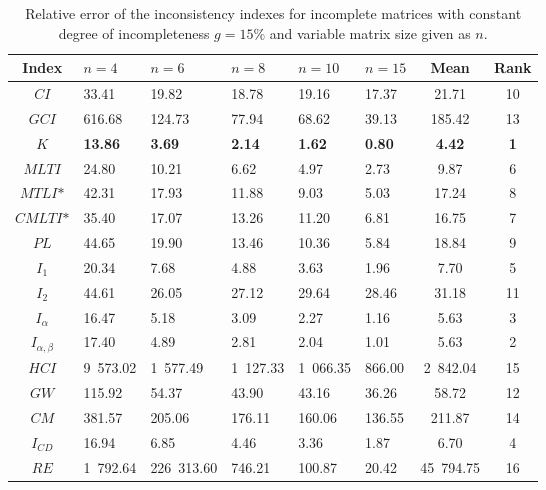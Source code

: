 \begin{table}[ht]
\begin{center}
\caption{Relative error of the inconsistency indexes for incomplete matrices with constant degree of incompleteness $g=15\%$ and variable matrix size given as $n$.}
\label{tab:results1}
\begin{tabular}{|c||l|l|l|l|l||c|c|}
\hline Index & $n = 4$ & $n = 6$ & $n = 8$ & $n = 10$ & $n = 15$ & Mean & Rank \\ \hline \hline
$\textit{CI}$ & 33.41 & 19.82 & 18.78 & 19.16 & 17.37 & 21.71 & 10 \\ \hline
$\textit{GCI}$ & 616.68 & 124.73 & 77.94 & 68.62 & 39.13 & 185.42 & 13 \\ \hline
$\textit{K}$ & \textbf{13.86} & \textbf{3.69} & \textbf{2.14} & \textbf{1.62} & \textbf{0.80} & \textbf{4.42} & \textbf{1} \\ \hline
$\textit{MLTI}$ & 24.80 & 10.21 & 6.62 & 4.97 & 2.73 & 9.87 & 6 \\ \hline
$\textit{MTLI*}$ & 42.31 & 17.93 & 11.88 & 9.03 & 5.03 & 17.24 & 8 \\ \hline
$\textit{CMLTI*}$ & 35.40 & 17.07 & 13.26 & 11.20 & 6.81 & 16.75 & 7 \\ \hline
$\textit{PL}$ & 44.65 & 19.90 & 13.46 & 10.36 & 5.84 & 18.84 & 9 \\ \hline
$I_1$ & 20.34 & 7.68 & 4.88 & 3.63 & 1.96 & 7.70 & 5 \\ \hline
$I_2$ & 44.61 & 26.05 & 27.12 & 29.64 & 28.46 & 31.18 & 11 \\ \hline
$I_{\alpha}$ & 16.47 & 5.18 & 3.09 & 2.27 & 1.16 & 5.63 & 3 \\ \hline
$I_{\alpha,\beta}$ & 17.40 & 4.89 & 2.81 & 2.04 & 1.01 & 5.63 & 2 \\ \hline
$\textit{HCI}$ & 9 573.02 & 1 577.49 & 1 127.33 & 1 066.35 & 866.00 & 2 842.04 & 15 \\ \hline
$\textit{GW}$ & 115.92 & 54.37 & 43.90 & 43.16 & 36.26 & 58.72 & 12 \\ \hline
$\textit{CM}$ & 381.57 & 205.06 & 176.11 & 160.06 & 136.55 & 211.87 & 14 \\ \hline
$I_{CD}$ & 16.94 & 6.85 & 4.46 & 3.36 & 1.87 & 6.70 & 4 \\ \hline
$\textit{RE}$ & 1 792.64 & 226 313.60 & 746.21 & 100.87 & 20.42 & 45 794.75 & 16 \\ \hline
\end{tabular}
\end{center}
\end{table}

